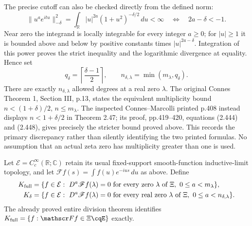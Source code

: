 The precise cutoff can also be checked directly from the defined norm:
\[
 \|u^a e^{itu}\|_{-\delta}^2
   =\int_{\mathbb R}|u|^{2a}(1+u^2)^{-\delta/2}\,du<\infty
 \quad\Longleftrightarrow\quad 2a-\delta<-1.
\]
Near zero the integrand is locally integrable for every integer $a\geq0$;
for $|u|\geq1$ it is bounded above and below by positive constants
times $|u|^{2a-\delta}$. Integration of this power proves the strict
inequality and the logarithmic divergence at equality. Hence set
\begin{equation}\label{eq:cq-sobolev-jetcount}
 q_\delta=\left\lceil\frac{\delta-1}{2}\right\rceil,
 \qquad n_{\delta,\lambda}=\min(m_\lambda,q_\delta).
\end{equation}
There are exactly $n_{\delta,\lambda}$ allowed degrees at a real zero
$\lambda$. The original Connes Theorem 1, Section III, p.13, states
the equivalent multiplicity bound $n<(1+\delta)/2$, $n\leq m_\lambda$.
The inspected Connes--Marcolli printed p.408 instead displays
$n<1+\delta/2$ in Theorem 2.47; its proof, pp.419--420,
equations (2.444) and (2.448), gives precisely the stricter bound
proved above. This records the primary discrepancy rather than
silently identifying the two printed formulas. No assumption that
an actual zeta zero has multiplicity greater than one is used.

Let $\mathcal E=C_c^\infty(\mathbb R;\mathbb C)$ retain its usual
fixed-support smooth-function inductive-limit topology, and let
$\mathscr Ff(s)=\int f(u)e^{-ius}\,du$ as above. Define
\begin{align}
 K_{\rm full}
   &=\{f\in\mathcal E:\ D^a\mathscr Ff(\lambda)=0
               \text{ for every zero }\lambda\text{ of }\Xi,
                         \ 0\leq a<m_\lambda\},
       \label{eq:cq-sobolev-full-kernel}\\
 K_\delta
   &=\{f\in\mathcal E:\ D^a\mathscr Ff(\lambda)=0
               \text{ for every real zero }\lambda\text{ of }\Xi,
                         \ 0\leq a<n_{\delta,\lambda}\}.
       \label{eq:cq-sobolev-kernel}
\end{align}
The already proved entire division theorem identifies
$K_{\rm full}=\{f:\mathscr Ff\in\Xi\cqE\}$ exactly.

